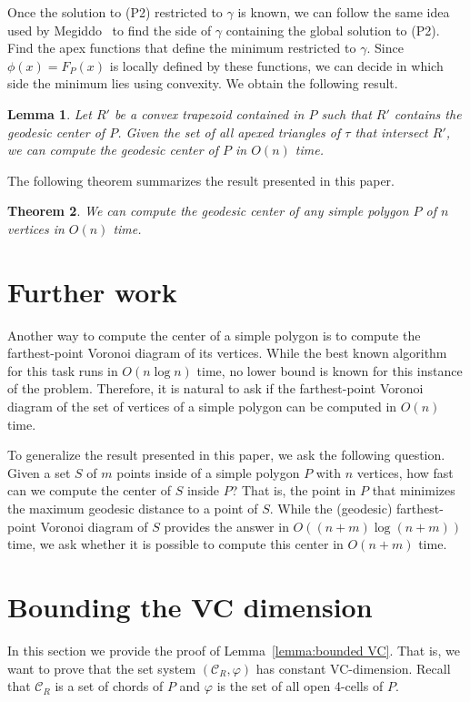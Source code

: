 \documentclass[a4paper]{article}
\newtheorem{theorem}{Theorem}[section]
\newtheorem{lemma}[theorem]{Lemma}
\newcommand{\F}[2]{\ensuremath{F_{\scriptscriptstyle #1}(#2)}}
\newcommand{\reg}{\ensuremath{R'}}
\newcommand{\tcells}{4-cells\xspace}
\newcommand{\C}{\ensuremath{{\mathcal C_R}}}
\begin{document}
Once the solution to (P2) restricted to $\gamma$ is known, we can follow the same idea used by Megiddo~\cite{megiddo1989ball} to find the side of $\gamma$ containing the global solution to (P2). 
Find the apex functions that define the minimum restricted to $\gamma$. 
Since $\phi(x) = \F{P}{x}$ is locally defined by these functions, 
we can decide in which side the minimum lies using convexity.
We obtain the following result.

\begin{lemma}
Let $\reg$ be a convex trapezoid contained in $P$ such that $\reg$ contains the geodesic center of $P$. 
Given the set of all apexed triangles of $\tau$ that intersect $\reg$, 
we can compute the geodesic center of $P$ in $O(n)$ time.
\end{lemma}

The following theorem summarizes the result presented in this paper.

\begin{theorem}
We can compute the geodesic center of any simple polygon $P$ of $n$ vertices in $O(n)$ time.
\end{theorem}

\section{Further work}
Another way to compute the center of a simple polygon is to compute the farthest-point Voronoi diagram of its vertices. While the best known algorithm for this task runs in $O(n\log n )$ time, no lower bound is known for this instance of the problem. Therefore, it is natural to ask if the farthest-point Voronoi diagram of the set of vertices of a simple polygon can be computed in $O(n)$ time.

To generalize the result presented in this paper, we ask the following question. Given a set $S$ of $m$ points inside of a simple polygon $P$ with $n$ vertices, how fast can we compute the center of $S$ inside $P$?
That is, the point in $P$ that minimizes the maximum geodesic distance to a point of $S$. While the (geodesic) farthest-point Voronoi diagram of $S$ provides the answer in $O((n+m) \log (n+m))$ time, we ask whether it is possible to compute this center in $O(n + m)$ time.





\appendix
\section{Bounding the VC dimension}
In this section we provide the proof of Lemma~\ref{lemma:bounded VC}. That is, we want to prove that the set system $(\C, \varphi)$ has constant VC-dimension.
Recall that $\C$ is a set of chords of $P$ and $\varphi$ is the set of all open \tcells of $P$.
 
\end{document}
